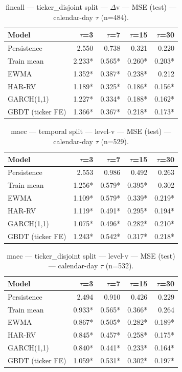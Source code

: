 \begin{table}[t]
\centering
\begin{tabular}{lrrrr}
\toprule
Model & $\tau$=3 & $\tau$=7 & $\tau$=15 & $\tau$=30 \\
\midrule
Persistence & 2.550 & 0.738 & 0.321 & 0.220 \\
Train mean & 2.233* & 0.565* & 0.260* & 0.203* \\
EWMA & 1.352* & 0.387* & 0.238* & 0.212 \\
HAR-RV & 1.189* & 0.325* & 0.186* & 0.156* \\
GARCH(1,1) & 1.227* & 0.334* & 0.188* & 0.162* \\
GBDT (ticker FE) & 1.366* & 0.367* & 0.218* & 0.173* \\
\bottomrule
\end{tabular}
\caption{fincall — ticker\_disjoint split — $\Delta$v — MSE (test) — calendar-day $\tau$ (n=484).}
\end{table}

\begin{table}[t]
\centering
\begin{tabular}{lrrrr}
\toprule
Model & $\tau$=3 & $\tau$=7 & $\tau$=15 & $\tau$=30 \\
\midrule
Persistence & 2.553 & 0.986 & 0.492 & 0.263 \\
Train mean & 1.256* & 0.579* & 0.395* & 0.302 \\
EWMA & 1.109* & 0.579* & 0.339* & 0.219* \\
HAR-RV & 1.119* & 0.491* & 0.295* & 0.194* \\
GARCH(1,1) & 1.075* & 0.496* & 0.282* & 0.210* \\
GBDT (ticker FE) & 1.243* & 0.542* & 0.317* & 0.218* \\
\bottomrule
\end{tabular}
\caption{maec — temporal split — level-v — MSE (test) — calendar-day $\tau$ (n=529).}
\end{table}

\begin{table}[t]
\centering
\begin{tabular}{lrrrr}
\toprule
Model & $\tau$=3 & $\tau$=7 & $\tau$=15 & $\tau$=30 \\
\midrule
Persistence & 2.494 & 0.910 & 0.426 & 0.229 \\
Train mean & 0.933* & 0.565* & 0.366* & 0.264 \\
EWMA & 0.867* & 0.505* & 0.282* & 0.189* \\
HAR-RV & 0.845* & 0.457* & 0.258* & 0.175* \\
GARCH(1,1) & 0.840* & 0.441* & 0.233* & 0.164* \\
GBDT (ticker FE) & 1.059* & 0.531* & 0.302* & 0.197* \\
\bottomrule
\end{tabular}
\caption{maec — ticker\_disjoint split — level-v — MSE (test) — calendar-day $\tau$ (n=532).}
\end{table}


